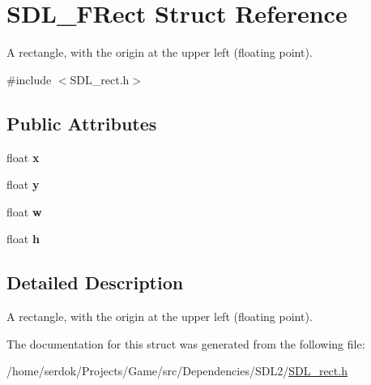 \hypertarget{structSDL__FRect}{}\section{S\+D\+L\+\_\+\+F\+Rect Struct Reference}
\label{structSDL__FRect}


A rectangle, with the origin at the upper left (floating point).  




{\ttfamily \#include $<$S\+D\+L\+\_\+rect.\+h$>$}

\subsection*{Public Attributes}
\begin{DoxyCompactItemize}
\item 
\mbox{\label{structSDL__FRect_a7dff6b929b472aa0c3989bec52bd01e0}} 
float {\bfseries x}
\item 
\mbox{\label{structSDL__FRect_a9c7105750c0b4b1d27ee86ecd29835b3}} 
float {\bfseries y}
\item 
\mbox{\label{structSDL__FRect_a8be19bcef20d0dc94302bfc092583bd7}} 
float {\bfseries w}
\item 
\mbox{\label{structSDL__FRect_a23dacbd4579fa5a425435124b197a183}} 
float {\bfseries h}
\end{DoxyCompactItemize}


\subsection{Detailed Description}
A rectangle, with the origin at the upper left (floating point). 

The documentation for this struct was generated from the following file\+:\begin{DoxyCompactItemize}
\item 
/home/serdok/\+Projects/\+Game/src/\+Dependencies/\+S\+D\+L2/\hyperlink{SDL__rect_8h}{S\+D\+L\+\_\+rect.\+h}\end{DoxyCompactItemize}
